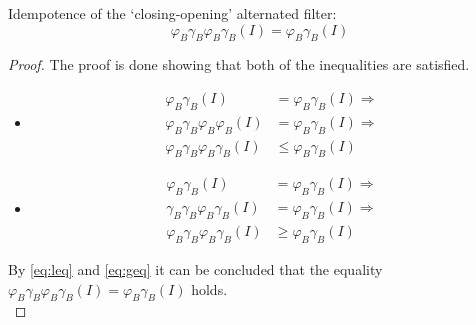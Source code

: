 \begin{thm}
    Idempotence of the `closing-opening' alternated filter:
    $$
    \varphi_B\gamma_B\varphi_B\gamma_B(I) = \varphi_B\gamma_B(I)
    $$

    \begin{proof}
        The proof is done showing that both of the inequalities are satisfied.
        \begin{itemize}
            \item[]
            \noindent{}
            \begin{equation}
            \begin{aligned}
                \varphi_B\gamma_B(I) &= \varphi_B\gamma_B(I) \Rightarrow \\
                \varphi_B\gamma_B\varphi_B\varphi_B(I) &= \varphi_B\gamma_B(I) \Rightarrow \\
                \varphi_B\gamma_B\varphi_B\gamma_B(I) &\leq \varphi_B\gamma_B(I)
            \end{aligned}
            \label{eq:leq}
            \end{equation}
            \item[]
            \noindent{}
            \begin{equation}
            \begin{aligned}
                \varphi_B\gamma_B(I) &= \varphi_B\gamma_B(I) \Rightarrow \\
                \gamma_B\gamma_B\varphi_B\gamma_B(I) &= \varphi_B\gamma_B(I) \Rightarrow \\
                \varphi_B\gamma_B\varphi_B\gamma_B(I) &\geq \varphi_B\gamma_B(I)
            \end{aligned}
            \label{eq:geq}
            \end{equation}
        \end{itemize}
        By \eqref{eq:leq} and \eqref{eq:geq} it can be concluded that the equality $\varphi_B\gamma_B\varphi_B\gamma_B(I) = \varphi_B\gamma_B(I)$ holds. \\
    \end{proof}
\end{thm}
